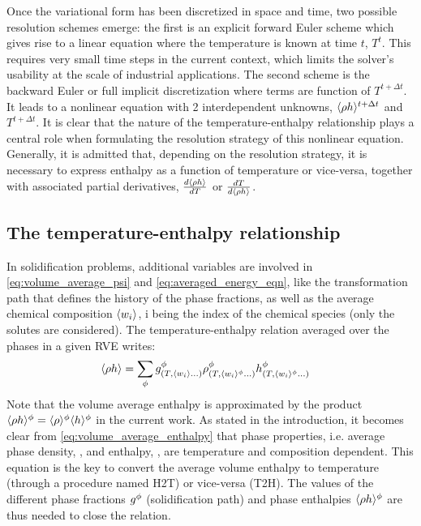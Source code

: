 Once the variational form has been discretized in space and time, two possible resolution schemes emerge: the first is an 
explicit forward Euler scheme which gives rise to a linear equation where the temperature is known at time $t$, $T^t$. This requires very small 
time steps in the current context, which limits the solver’s usability at the scale of industrial applications. The second scheme is the 
backward Euler or full implicit discretization where terms are function of $T^{t+\Delta t}$. It leads to a nonlinear equation with 2 interdependent 
unknowns, $\langle  \rho h  \rangle^{t+\Delta t}$ and  $T^{t+\Delta t}$. It is clear that the nature of the temperature-enthalpy relationship plays a central 
role when formulating the resolution strategy of this nonlinear equation. Generally, it is admitted that, depending on the resolution strategy, 
it is necessary to express enthalpy as a function of temperature or vice-versa, together with associated partial derivatives, 
$\frac{d \langle  \rho h  \rangle}{dT}$ or $\frac{dT }{d \langle  \rho h  \rangle}$.

\subsection{The temperature-enthalpy relationship} 
In solidification problems, additional variables are involved in \eqref{eq:volume_average_psi} and \eqref{eq:averaged_energy_eqn}, 
like the transformation path that defines the history of the phase fractions, as well as the average chemical composition $\langle w_i \rangle$, 
i being the index of the chemical species (only the solutes are considered). The temperature-enthalpy relation averaged over the 
phases in a given RVE writes:
\begin{align}
\label{eq:volume_average_enthalpy}
& \rh = \sum_\phi \gphi_{\brac{T, \wi \dots}} \rphi_{\brac{T, \wi^{\phi} \dots}} \hphi_{\brac{T, \wi^{\phi} \dots}}
\end{align}
Note that the volume average enthalpy is approximated by the product $\langle \rho h \rangle^{\phi}=\langle \rho \rangle^{\phi}\langle h \rangle^{\phi}$ in the current work. As stated 
in the introduction, it becomes clear from \eqref{eq:volume_average_enthalpy} that phase properties, i.e. average phase density, , \rphi and enthalpy, \hphi, 
are temperature and composition dependent. This equation is the key to convert the average volume enthalpy to temperature (through a procedure named H2T) 
or vice-versa (T2H). The values of the different phase fractions $g^{\phi} $ (solidification path) and phase enthalpies $\langle  \rho h  \rangle^{\phi}$ are thus needed 
to close the relation.

